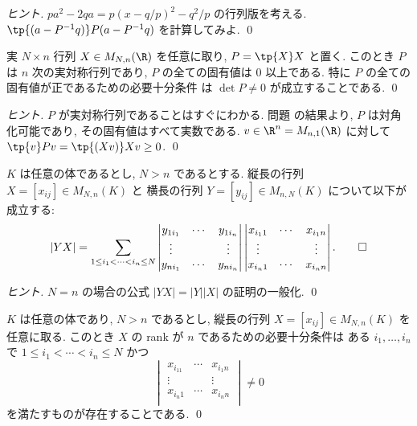 \documentclass[12pt,twoside]{jarticle}
\begin{document}
\begin{proof}[ヒント]
  $pa^2-2qa = p(x-q/p)^2 - q^2/p$ の行列版を考える.
  $\tp{(a-P^{-1}q)}P(a-P^{-1}q)$ を計算してみよ.
  \qed
\end{proof}

\begin{question}[5点]
  実 $N\times n$ 行列 $X\in M_{N,n}(\R)$ を任意に取り, $P=\tp{X}X$ と置く.
  このとき $P$ は $n$ 次の実対称行列であり, 
  $P$ の全ての固有値は $0$ 以上である.
  特に $P$ の全ての固有値が正であるための必要十分条件
  は $\det P\ne 0$ が成立することである.
  \qed
\end{question}

\begin{proof}[ヒント]
  $P$ が実対称行列であることはすぐにわかる.
  問題  の結果より, 
  $P$ は対角化可能であり, その固有値はすべて実数である.
  $v\in\R^n=M_{n,1}(\R)$ に対して $\tp{v}Pv=\tp{(Xv)}Xv\ge 0$.
  \qed
\end{proof}

\begin{question}[Laplace展開, 10点]
  $K$ は任意の体であるとし, $N > n$ であるとする.
  縦長の行列 $X=[x_{ij}]\in M_{N,n}(K)$ と
  横長の行列 $Y=[y_{ij}]\in M_{n,N}(K)$ について以下が成立する:
  \begin{equation*}
    |YX| =
    \sum_{1\le i_1<\cdots<i_n\le N}
    \begin{vmatrix}
      y_{1i_1} & \cdots & y_{1i_n} \\
      \vdots   &        & \vdots   \\
      y_{ni_1} & \cdots & y_{ni_n} \\
    \end{vmatrix}
    \begin{vmatrix}
      x_{i_11} & \cdots & x_{i_1n} \\
      \vdots   &        & \vdots   \\
      x_{i_n1} & \cdots & x_{i_nn} \\
    \end{vmatrix}.
    \qed
  \end{equation*}
\end{question}

\begin{proof}[ヒント]
  $N=n$ の場合の公式 $|YX|=|Y||X|$ の証明の一般化. \qed
\end{proof}

\begin{question}[5点]
  $K$ は任意の体であり,  $N > n$ であるとし, 
  縦長の行列 $X=[x_{ij}]\in M_{N,n}(K)$ を任意に取る.
  このとき $X$ の rank が $n$ であるための必要十分条件は
  ある $i_1,\ldots,i_n$ で $1\le i_1<\cdots<i_n\le N$ かつ
  \begin{equation*}
    \begin{vmatrix}
      x_{i_11} & \cdots & x_{i_1n} \\
      \vdots   &        & \vdots   \\
      x_{i_n1} & \cdots & x_{i_nn} \\
    \end{vmatrix}
    \ne 0
  \end{equation*}
  を満たすものが存在することである.  \qed
\end{question}
\end{document}
